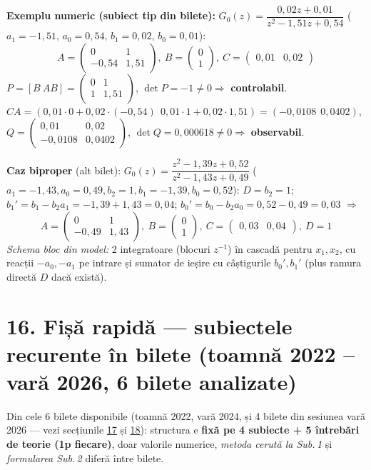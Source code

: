 \documentclass[10pt,a4paper]{article}
\begin{document}
\textbf{Exemplu numeric (subiect tip din bilete):} $G_0(z)=\dfrac{0{,}02z+0{,}01}{z^2-1{,}51z+0{,}54}$ ($a_1{=}{-}1{,}51,\,a_0{=}0{,}54,\,b_1{=}0{,}02,\,b_0{=}0{,}01$):
$$A=\begin{pmatrix}0&1\\-0{,}54&1{,}51\end{pmatrix},\ B=\begin{pmatrix}0\\1\end{pmatrix},\ C=\begin{pmatrix}0{,}01&0{,}02\end{pmatrix}$$
$P=[B\ AB]=\begin{pmatrix}0&1\\1&1{,}51\end{pmatrix}$, $\det P=-1\ne0\Rightarrow$ \textbf{controlabil}. $CA=(0{,}01{\cdot}0{+}0{,}02{\cdot}({-}0{,}54)\ \ 0{,}01{\cdot}1{+}0{,}02{\cdot}1{,}51)=({-}0{,}0108\ \ 0{,}0402)$, $Q=\begin{pmatrix}0{,}01&0{,}02\\-0{,}0108&0{,}0402\end{pmatrix}$, $\det Q=0{,}000618\ne0\Rightarrow$ \textbf{observabil}.

\textbf{Caz biproper} (alt bilet): $G_0(z)=\dfrac{z^2-1{,}39z+0{,}52}{z^2-1{,}43z+0{,}49}$ ($a_1{=}{-}1{,}43,a_0{=}0{,}49,b_2{=}1,b_1{=}{-}1{,}39,b_0{=}0{,}52$): $D=b_2=1$; $b_1'=b_1-b_2a_1=-1{,}39+1{,}43=0{,}04$; $b_0'=b_0-b_2a_0=0{,}52-0{,}49=0{,}03$ $\Rightarrow$
$$A=\begin{pmatrix}0&1\\-0{,}49&1{,}43\end{pmatrix},\ B=\begin{pmatrix}0\\1\end{pmatrix},\ C=\begin{pmatrix}0{,}03&0{,}04\end{pmatrix},\ D=1$$
\textit{Schema bloc din model:} 2 integratoare (blocuri $z^{-1}$) în cascadă pentru $x_1,x_2$, cu reacții $-a_0,-a_1$ pe intrare și sumator de ieșire cu câștigurile $b_0',b_1'$ (plus ramura directă $D$ dacă există).

\section*{16. Fișă rapidă — subiectele recurente în bilete (toamnă 2022 – vară 2026, 6 bilete analizate)}\label{sec:16}
Din cele 6 bilete disponibile (toamnă 2022, vară 2024, și 4 bilete din sesiunea vară 2026 — vezi secțiunile \hyperref[sec:17]{17} și \hyperref[sec:18]{18}): structura e \textbf{fixă pe 4 subiecte + 5 întrebări de teorie (1p fiecare)}, doar valorile numerice, \emph{metoda cerută la Sub.\,1} și \emph{formularea Sub.\,2} diferă între bilete.
\end{document}
